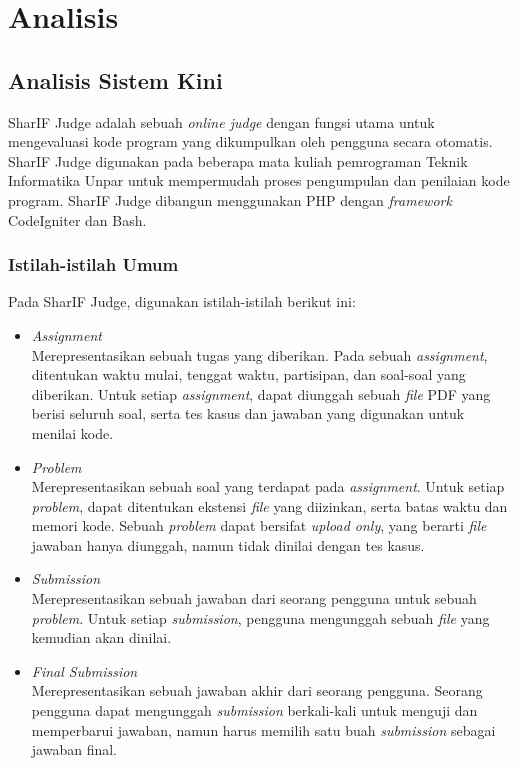 \chapter{Analisis}
\label{chap:analisis}

\section{Analisis Sistem Kini}
\label{sec:3:analisiskini} 

SharIF Judge adalah sebuah \textit{online judge} dengan fungsi utama untuk mengevaluasi kode program yang dikumpulkan oleh pengguna secara otomatis. SharIF Judge digunakan pada beberapa mata kuliah pemrograman Teknik Informatika Unpar untuk mempermudah proses pengumpulan dan penilaian kode program. SharIF Judge dibangun menggunakan PHP dengan \textit{framework} CodeIgniter dan Bash. 

\subsection{Istilah-istilah Umum}
\label{subs:3:assignment}

Pada SharIF Judge, digunakan istilah-istilah berikut ini:

\begin{itemize}
    \item \textit{Assignment} \\ Merepresentasikan sebuah tugas yang diberikan. Pada sebuah \textit{assignment}, ditentukan waktu mulai, tenggat waktu, partisipan, dan soal-soal yang diberikan. Untuk setiap \textit{assignment}, dapat diunggah sebuah \textit{file} PDF yang berisi seluruh soal, serta tes kasus dan jawaban yang digunakan untuk menilai kode.
    \item \textit{Problem} \\ Merepresentasikan sebuah soal yang terdapat pada \textit{assignment}. Untuk setiap \textit{problem}, dapat ditentukan ekstensi \textit{file} yang diizinkan, serta batas waktu dan memori kode. Sebuah \textit{problem} dapat bersifat \textit{upload only}, yang berarti \textit{file} jawaban hanya diunggah, namun tidak dinilai dengan tes kasus.
    \item \textit{Submission} \\ Merepresentasikan sebuah jawaban dari seorang pengguna untuk sebuah \textit{problem}. Untuk setiap \textit{submission}, pengguna mengunggah sebuah \textit{file} yang kemudian akan dinilai.
    \item \textit{Final Submission} \\ Merepresentasikan sebuah jawaban akhir dari seorang pengguna. Seorang pengguna dapat mengunggah \textit{submission} berkali-kali untuk menguji dan memperbarui jawaban, namun harus memilih satu buah \textit{submission} sebagai jawaban final.
\end{itemize}

